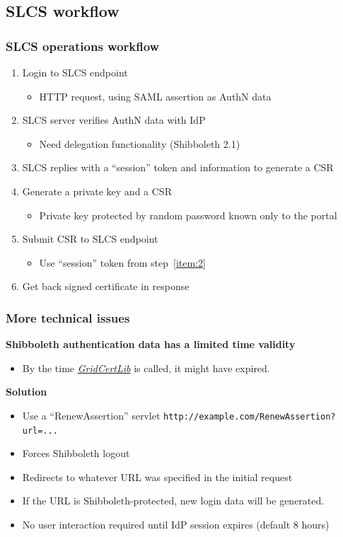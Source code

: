 \documentclass{beamer}
\newcommand{\+}{\vspace{1em}}
\newcommand{\GridCertLib}{\href{http://gridcertlib.googlecode.com/}{{\em GridCertLib}}}
\begin{document}
\subsection{SLCS workflow}

\begin{frame}[label=more-slcs]
  \frametitle{SLCS operations workflow}
  \begin{enumerate}
  \item Login to SLCS endpoint
    \begin{itemize}
    \item HTTP request, using SAML assertion as AuthN data
    \end{itemize}
  \item SLCS server verifies AuthN data with IdP
    \begin{itemize}
    \item Need delegation functionality (Shibboleth 2.1)
    \end{itemize}
  \item\label{item:2} SLCS replies with a ``session'' token and information
    to generate a CSR
  \item Generate a private key and a CSR
    \begin{itemize}
    \item Private key protected by random password known only to the portal
    \end{itemize}
  \item Submit CSR to SLCS endpoint
    \begin{itemize}
    \item Use ``session'' token from step~\ref{item:2}
    \end{itemize}
  \item Get back signed certificate in response
  \end{enumerate}

  \+
  \hyperlink{slcs}{}
\end{frame}


\begin{frame}
  \frametitle{More technical issues}
  
  \textbf{Shibboleth authentication data has a limited time validity}
  \begin{itemize}
  \item By the time \GridCertLib{} is called, it might have expired.
  \end{itemize}

  \+
  \textbf{Solution}
  \begin{itemize}
  \item Use a ``RenewAssertion'' servlet \texttt{http://example.com/RenewAssertion?url=...}
  \item Forces Shibboleth logout
  \item Redirects to whatever URL was specified in the initial request
  \item If the URL is Shibboleth-protected, new login data will be generated.
  \item No user interaction required until IdP session expires
    (default 8 hours)
  \end{itemize}
\end{frame}
\end{document}
